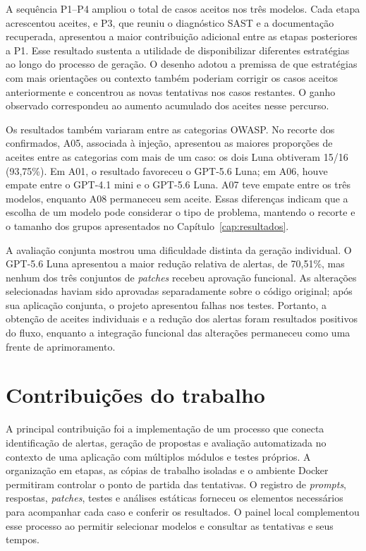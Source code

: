 A sequência P1--P4 ampliou o total de casos aceitos nos três modelos. Cada etapa acrescentou aceites, e P3, que reuniu o diagnóstico SAST e a documentação recuperada, apresentou a maior contribuição adicional entre as etapas posteriores a P1. Esse resultado sustenta a utilidade de disponibilizar diferentes estratégias ao longo do processo de geração. O desenho adotou a premissa de que estratégias com mais orientações ou contexto também poderiam corrigir os casos aceitos anteriormente e concentrou as novas tentativas nos casos restantes. O ganho observado correspondeu ao aumento acumulado dos aceites nesse percurso.

Os resultados também variaram entre as categorias OWASP. No recorte dos confirmados, A05, associada à injeção, apresentou as maiores proporções de aceites entre as categorias com mais de um caso: os dois Luna obtiveram 15/16 (93,75\%). Em A01, o resultado favoreceu o GPT-5.6 Luna; em A06, houve empate entre o GPT-4.1 mini e o GPT-5.6 Luna. A07 teve empate entre os três modelos, enquanto A08 permaneceu sem aceite. Essas diferenças indicam que a escolha de um modelo pode considerar o tipo de problema, mantendo o recorte e o tamanho dos grupos apresentados no Capítulo~\ref{cap:resultados}.

A avaliação conjunta mostrou uma dificuldade distinta da geração individual. O GPT-5.6 Luna apresentou a maior redução relativa de alertas, de 70,51\%, mas nenhum dos três conjuntos de \textit{patches} recebeu aprovação funcional. As alterações selecionadas haviam sido aprovadas separadamente sobre o código original; após sua aplicação conjunta, o projeto apresentou falhas nos testes. Portanto, a obtenção de aceites individuais e a redução dos alertas foram resultados positivos do fluxo, enquanto a integração funcional das alterações permaneceu como uma frente de aprimoramento.

\section{Contribuições do trabalho}

\label{sec:cf-contribuicoes}

A principal contribuição foi a implementação de um processo que conecta identificação de alertas, geração de propostas e avaliação automatizada no contexto de uma aplicação com múltiplos módulos e testes próprios. A organização em etapas, as cópias de trabalho isoladas e o ambiente Docker permitiram controlar o ponto de partida das tentativas. O registro de \textit{prompts}, respostas, \textit{patches}, testes e análises estáticas forneceu os elementos necessários para acompanhar cada caso e conferir os resultados. O painel local complementou esse processo ao permitir selecionar modelos e consultar as tentativas e seus tempos.

